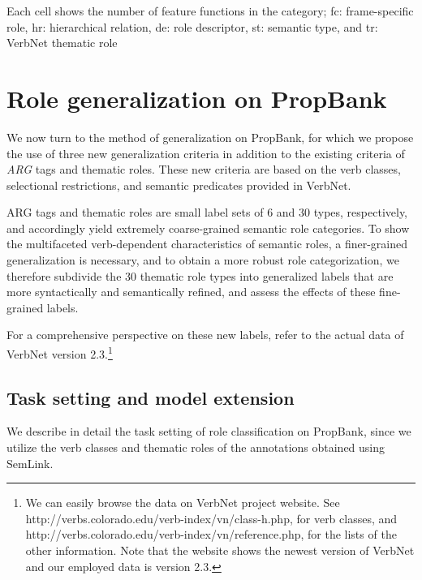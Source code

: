 \documentclass[english]{jnlp_1.4_rep}
\begin{document}
\begin{table}[t]
\label{top1000}

\vspace{4pt}\small
Each cell shows the number
of feature functions in the category; fc: frame-specific role, hr: hierarchical relation, de: role
descriptor, st: semantic type, and tr: VerbNet thematic role
\par
\end{table}


\section{Role generalization on PropBank}
\label{sec:generalization-criteria-propbank}

We now turn to the method of generalization on PropBank, for which we propose the use of three new generalization criteria in addition to the existing criteria of {\it ARG} tags and thematic roles. These new criteria are based on the verb classes, selectional restrictions, and semantic predicates provided in VerbNet.

ARG tags and thematic roles are small label sets of 6 and 30 types, respectively, and \mbox{accordingly} yield extremely coarse-grained semantic role categories. To show the multifaceted verb-dependent characteristics of semantic roles, a finer-grained generalization is necessary, and to obtain a more robust role categorization, we therefore subdivide the 30 thematic role types into generalized labels that are more syntactically and semantically refined, and assess the effects of these fine-grained labels.

For a comprehensive perspective on these new labels, refer to the actual data of VerbNet version 2.3.\footnote{We can easily browse the data on VerbNet project website. See
http://verbs.colorado.edu/verb-index/vn/class-h.php, for verb classes, and
http://verbs.colorado.edu/verb-index/vn/reference.php, for the lists of the other information. Note that the website shows the newest version of VerbNet and our employed data is version 2.3.}


\subsection{Task setting and model extension}

We describe in detail the task setting of role classification on PropBank, since we utilize the verb classes and thematic roles of the annotations obtained using SemLink.
\end{document}
